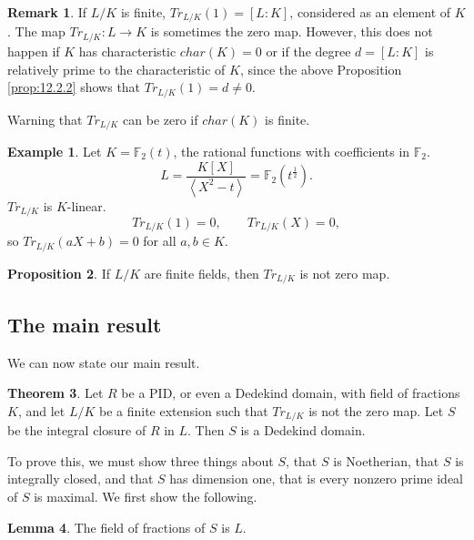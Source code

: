 \documentclass{article}
\newcommand{\F}{\mathbb{F}}
\newcommand{\rb}[1]{\left( #1 \right)}
\renewcommand{\sb}[1]{\left[ #1 \right]}
\newcommand{\ab}[1]{\left\langle #1 \right\rangle}
\theoremstyle{definition}\newtheorem{definition}{Definition}[subsection]
\theoremstyle{definition}\newtheorem{remark}[definition]{Remark}
\theoremstyle{definition}\newtheorem*{example}{Example}
\theoremstyle{definition}\newtheorem*{note}{Note}
\newtheorem{proposition}[definition]{Proposition}
\newtheorem{lemma}[definition]{Lemma}
\newtheorem{theorem}[definition]{Theorem}
\begin{document}
\begin{remark}
If $ L / K $ is finite, $ Tr_{L / K}\rb{1} = \sb{L : K} $, considered as an element of $ K $. The map $ Tr_{L / K} : L \to K $ is sometimes the zero map. However, this does not happen if $ K $ has characteristic $ char\rb{K} = 0 $ or if the degree $ d = \sb{L : K} $ is relatively prime to the characteristic of $ K $, since the above Proposition \ref{prop:12.2.2} shows that $ Tr_{L / K}\rb{1} = d \ne 0 $.
\end{remark}

Warning that $ Tr_{L / K} $ can be zero if $ char\rb{K} $ is finite.

\begin{example}
Let $ K = \F_2\rb{t} $, the rational functions with coefficients in $ \F_2 $.
$$ L = \dfrac{K\sb{X}}{\ab{X^2 - t}} = \F_2\rb{t^{\tfrac{1}{2}}}. $$
$ Tr_{L / K} $ is $ K $-linear.
$$ Tr_{L / K}\rb{1} = 0, \qquad Tr_{L / K}\rb{X} = 0, $$
so $ Tr_{L / K}\rb{aX + b} = 0 $ for all $ a, b \in K $.
\end{example}

\begin{proposition}
If $ L / K $ are finite fields, then $ Tr_{L / K} $ is not zero map.
\end{proposition}

\subsection{The main result}

We can now state our main result.

\begin{theorem}
Let $ R $ be a PID, or even a Dedekind domain, with field of fractions $ K $, and let $ L / K $ be a finite extension such that $ Tr_{L / K} $ is not the zero map. Let $ S $ be the integral closure of $ R $ in $ L $. Then $ S $ is a Dedekind domain.
\end{theorem}

To prove this, we must show three things about $ S $, that $ S $ is Noetherian, that $ S $ is integrally closed, and that $ S $ has dimension one, that is every nonzero prime ideal of $ S $ is maximal. We first show the following.

\begin{lemma}
The field of fractions of $ S $ is $ L $.
\end{lemma}
\end{document}
